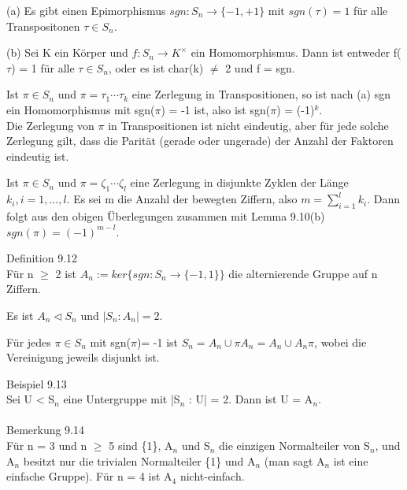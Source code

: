 \documentclass[fontsize=10pt]{scrartcl}
\begin{document}
\begin{compactenum}
\item[(a)] Es gibt einen Epimorphismus $sgn: S_n \to \{-1,+1\}$ mit $sgn(\tau) = 1$ für alle Transpositonen $\tau \in S_n$.
\item[(b)] Sei K ein Körper und $f: S_n \to K^\times$ ein Homomorphismus. Dann ist entweder f($\tau$) = 1 für alle $\tau \in S_n$, oder es ist char(k) $\neq$ 2 und f = sgn.
\end{compactenum}
\begin{compactitem}
\item Ist $\pi \in S_n$ und $\pi = \tau_1 \cdots \tau_k$ eine Zerlegung in Transpositionen, so ist nach (a) sgn ein Homomorphismus mit sgn($\pi$) = -1 ist, also ist sgn($\pi$) = (-1)$^k$.\\
Die Zerlegung von $\pi$ in Transpositionen ist nicht eindeutig, aber für jede solche Zerlegung gilt, dass die Parität (gerade oder ungerade) der Anzahl der Faktoren eindeutig ist.
\item Ist $\pi \in S_n$ und $\pi = \zeta_1 \cdots \zeta_l$ eine Zerlegung in disjunkte Zyklen der Länge $k_i, i = 1, …, l$. Es sei m die Anzahl der bewegten Ziffern, also $m = \sum\nolimits_{i=1}^{l} k_i$. Dann folgt aus den obigen Überlegungen zusammen mit Lemma 9.10(b) $sgn(\pi) = (-1)^{m-l}$.\\
\end{compactitem}
Definition 9.12\\
Für n $\ge$ 2 ist $A_n := ker\{sgn : S_n \to \{-1,1\}\}$ die alternierende Gruppe auf n Ziffern.
\begin{compactitem}
\item Es ist $A_n \vartriangleleft S_n$ und $|S_n : A_n| = 2$.
\item Für jedes $\pi \in S_n$ mit sgn($\pi$)= -1 ist $S_n = A_n \cup \pi A_n = A_n \cup A_n \pi$, wobei die Vereinigung jeweils disjunkt ist.\\
\end{compactitem}
Beispiel 9.13\\
Sei U < S$_n$ eine Untergruppe mit |S$_n$ : U| = 2. Dann ist U = A$_n$.\\
\\
Bemerkung 9.14\\
Für n = 3 und n $\ge$ 5 sind \{1\}, A$_n$ und S$_n$ die einzigen Normalteiler von S$_n$, und A$_n$ besitzt nur die trivialen Normalteiler \{1\} und A$_n$ (man sagt A$_n$ ist eine einfache Gruppe). Für n = 4 ist A$_4$ nicht-einfach.\\
\\
\end{document}
